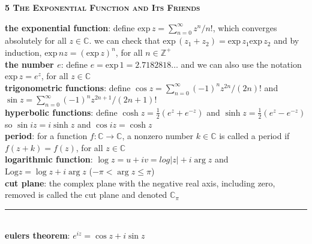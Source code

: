 \documentclass[a4paper]{article}
\newcommand*\abs[1]{\vert #1 \vert}
\newcommand*\linesep[0]{\noindent\rule{\textwidth}{0.5pt}\\}
\newcommand*\e[1]{\text{exp} \, #1}
\begin{document}
\begin{framed}
	\begin{center}
		\textbf{\textsc{5 The Exponential Function and Its Friends}}
	\end{center}
	\textbf{the exponential function}: define $\e{z} = \sum_{n=0}^\infty z^n / n!$, which converges absolutely for all $z \in \mathbb{C}$. we can check that $\e{(z_1 + z_2)} = \e{z_1}\e{z_2}$ and by induction, $\e{nz} = (\e{z})^n$, for all $n \in \mathbb{Z}^+$\\
	
	\noindent
	\textbf{the number $e$}: define $e = \e{1} = 2.7182818 \dots$ and we can also use the notation $\e{z} = e^z$, for all $z \in \mathbb{C}$\\
	
	\noindent
	\textbf{trigonometric functions}: define $\cos z = \sum_{n=0}^\infty (-1)^n z^{2n} / (2n)!$ and $\sin z = \sum_{n=0}^\infty (-1)^n z^{2n + 1} / (2n + 1)!$\\
	
	\noindent
	\textbf{hyperbolic functions}: define $\cosh z = \frac{1}{2}(e^z + e^{-z})$ and $\sinh z = \frac{1}{2}(e^z - e^{-z})$ so $\sin iz = i\sinh z$ and $\cos iz = \cosh z$\\
	
	\noindent
	\textbf{period}: for a function $f: \mathbb{C} \rightarrow \mathbb{C}$, a nonzero number $k \in \mathbb{C}$ is called a period if $f(z + k) = f(z)$, for all $z \in \mathbb{C}$\\
	
	\noindent
	\textbf{logarithmic function}: $\log z = u + iv = log \abs{z} + i \arg z$ and $\text{Log} z = \log z + i \arg z$ ($-\pi < \arg z \leq \pi$)\\
	
	\noindent
	\textbf{cut plane}: the complex plane with the negative real axis, including zero, removed is called the cut plane and denoted $\mathbb{C}_\pi$
	
	\linesep
	
	\noindent
	\textbf{eulers theorem}: $e^{iz} = \cos z + i \sin z$\\
	

\end{framed}
\end{document}
